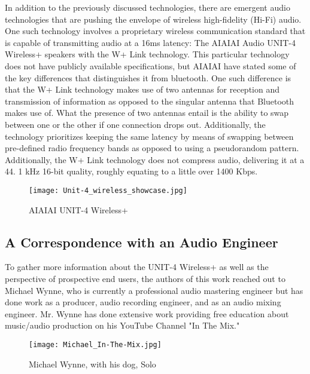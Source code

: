 \documentclass[conference]{IEEEtran}
\begin{document}
In addition to the previously discussed technologies, there are emergent audio technologies
that are pushing the envelope of wireless high-fidelity (Hi-Fi) audio. One such technology
involves a proprietary wireless communication standard that is capable of transmitting audio
at a 16ms latency: The AIAIAI Audio UNIT-4 Wireless+ speakers with the W+ Link technology.
This particular technology does not have publicly available specifications, but AIAIAI have
stated some of the key differences that distinguishes it from bluetooth. One such difference
is that the W+ Link technology makes use of two antennas for reception and transmission of
information as opposed to the singular antenna that Bluetooth makes use of. What the presence
of two antennas entail is the ability to swap between one or the other if one connection
drops out. Additionally, the technology prioritizes keeping the same latency by means of
swapping between pre-defined radio frequency bands as opposed to using a pseudorandom
pattern. Additionally, the W+ Link technology does not compress audio, delivering it at a 44.
1 kHz 16-bit quality, roughly equating to a little over 1400 Kbps.\cite{noauthor_unit-4_2023}

\begin{figure}[htbp]
    \centering
    \texttt{[image: Unit-4\_wireless\_showcase.jpg]}
    \caption{AIAIAI UNIT-4 Wireless+ \cite{noauthor_unit-4_2023}}
    \label{fig:unit-4_productPic}
\end{figure}

\subsection*{A Correspondence with an Audio Engineer}

To gather more information about the UNIT-4 Wireless+ as well as the perspective of prospective
end users, the authors of this work reached out to Michael Wynne, who is currently a professional
audio mastering engineer but has done work as a producer, audio recording engineer, and as an
audio mixing engineer. Mr. Wynne has done extensive work providing free education about
music/audio production on his YouTube Channel "In The Mix." \cite{wynne_i_nodate}

\begin{figure}[htbp]
    \centering
    \texttt{[image: Michael\_In-The-Mix.jpg]}
    \caption{Michael Wynne, with his dog, Solo}
    \label{fig:in-the-mix_portrait}
\end{figure}
\end{document}
